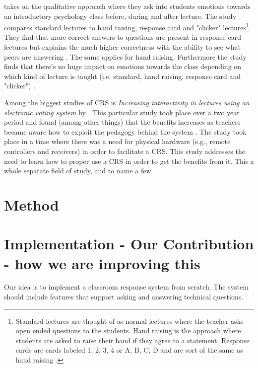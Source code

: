 \documentclass{article}
\begin{document}
 takes on the qualitative approach where they ask into students emotions towards an introductory psychology class before, during and after lecture. The study compares standard lectures to hand raising, response card and "clicker" lectures\footnote{Standard lectures are thought of as normal lectures where the teacher asks open ended questions to the students. Hand raising is the approach where students are asked to raise their hand if they agree to a statement. Response cards are cards labeled 1, 2, 3, 4 or A, B, C, D and are sort of the same as hand raising \cite[p.~254]{stowell2007benefits}.}. They find that more correct answers to questions are present in response card lectures but explains the much higher correctness with the ability to see what peers are answering \cite[p.~257]{stowell2007benefits}. The same applies for hand raising. Furthermore the study finds that there's no huge impact on emotions towards the class depending on which kind of lecture is taught (i.e. standard, hand raising, response card and "clicker") \cite{stowell2007benefits}.




Among the biggest studies of CRS is \emph{Increasing interactivity in lectures using an electronic voting system} by . This particular study took place over a two year period and found (among other things) that the benefits increases as teachers became aware how to exploit the pedagogy behind the system \cite[p.~93]{draper2004increasing}. The study took place in a time where there was a need for physical hardware (e.g., remote controllers and receivers) in order to facilitate a CRS. This study addresses the need to learn how to proper use a CRS in order to get the benefits from it. This a whole separate field of study, and to name a few 



\section{Method}


\section{Implementation - Our Contribution - how we are improving this}
Our idea is to implement a classroom response system from scratch. The system should include features that support asking and answering technical questions. 
\end{document}
